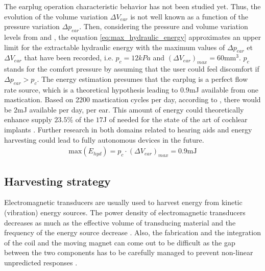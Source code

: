 \documentclass[3p,twocolumn,preprint]{elsarticle}
\begin{document}
The earplug operation characteristic behavior has not been studied yet. Thus, the evolution of the volume variation $\Delta V_{ear}$ is not well known as a function of the pressure variation $\Delta p_{ear}$. Then, considering the pressure and volume variation levels from \cite{Delnavaz2012} and \cite{Bouchard-Roy2020}, the equation \ref{eq:max_hydraulic_energy} approximates an upper limit for the extractable hydraulic energy with the maximum values of $\Delta p_{ear}$ et $\Delta V_{ear}$ that have been recorded, i.e. $p_c=12kPa$ and $(\Delta V_{ear})_{max}=60$mm$^3$. $p_c$ stands for the comfort pressure by assuming that the user could feel discomfort if $\Delta p_{ear}>p_c$. The energy estimation presumes that the earplug is a perfect flow rate source, which is a theoretical hypothesis leading to $0.9$mJ available from one mastication. Based on 2200 mastication cycles per day, according to \cite{Goll2011}, there would be $2$mJ available per day, per ear. This amount of energy could theoretically enhance supply $23.5$\% of the $17$J of needed for the state of the art of cochlear implants \cite{Kulah2022}. Further research in both domains related to hearing aids and energy harvesting could lead to fully autonomous devices in the future.
\begin{align}
	\text{max}(E_{hyd}) = p_c \cdot (\Delta V_{ear})_{max} = 0.9\text{mJ}
	\label{eq:max_hydraulic_energy}
\end{align}

	\subsection{Harvesting strategy}	
	\label{The harvesting strategy}
Electromagnetic transducers are usually used to harvest energy from kinetic (vibration) energy sources. The power density of electromagnetic transducers decreases as much as the effective volume of transducing material and the frequency of the energy source decrease \cite{Priya2017,Kulah2008}. Also, the fabrication and the integration of the coil and the moving magnet can come out to be difficult as the gap between the two components has to be carefully managed to prevent non-linear unpredicted responses \cite{Caruntu2001}. 
\end{document}
